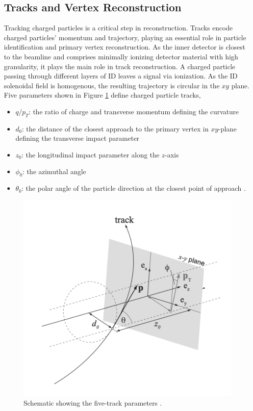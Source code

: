 \subsection{Tracks and Vertex Reconstruction}
\label{subsec:Tracking}
Tracking charged particles is a critical step in reconstruction. Tracks encode charged particles' momentum and trajectory, playing an essential role in particle identification and primary vertex reconstruction. As the inner detector is closest to the beamline and comprises minimally ionizing detector material with high granularity, it plays the main role in track reconstruction. A charged particle passing through different layers of ID leaves a signal via ionization. As the ID solenoidal field is homogenous, the resulting trajectory is circular in the $xy$ plane. Five parameters shown in Figure \ref{fig:TrackParameter} define charged particle tracks, 
\begin{itemize}
    \item{$q/p_{T}$: the ratio of charge and transverse momentum defining the curvature}
    \item{$d_{0}$: the distance of the closest approach to the primary vertex in $xy$-plane defining the transverse impact parameter}
    \item{$z_{0}$: the longitudinal impact parameter along the $z$-axis}
    \item{$\phi_{0}$: the azimuthal angle}
    \item{$\theta_{0}$: the polar angle of the particle direction at the closest point of approach \cite{TrackingRun2_ATLAS}.}
\end{itemize}

\begin{figure}[!htb]
    \centering
    \includegraphics[width=.6\linewidth]{figures/LHC/TrackParameters.png}
    \caption{ Schematic showing the five-track parameters \cite{TrackParameterFig}.\label{fig:TrackParameter}}
\end{figure}

